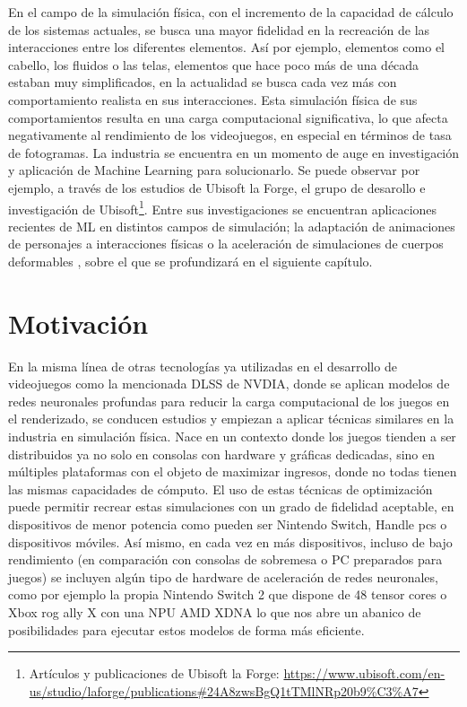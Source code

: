 En el campo de la simulación física, con el incremento de la capacidad de cálculo de los sistemas actuales, se busca una mayor fidelidad en la recreación de las interacciones entre los diferentes elementos. Así por ejemplo, elementos como el cabello, los fluidos o las telas, elementos que hace poco más de una década estaban muy simplificados, en la actualidad se busca cada vez más con comportamiento realista en sus interacciones. Esta simulación física de sus comportamientos resulta en una carga computacional significativa, lo que afecta negativamente al rendimiento de los videojuegos, en especial en términos de tasa de fotogramas. La industria se encuentra en un momento de auge en investigación y aplicación de Machine Learning para solucionarlo. Se puede observar por ejemplo, a través de los estudios de Ubisoft la Forge, el grupo de desarollo e investigación de Ubisoft\footnote{Artículos y publicaciones de Ubisoft la Forge: \url{https://www.ubisoft.com/en-us/studio/laforge/publications\#24A8zwsBgQ1tTMlNRp20b9\%C3\%A7}}. Entre sus investigaciones se encuentran aplicaciones recientes de ML en distintos campos de simulación; la adaptación de animaciones de personajes a interacciones físicas \cite{drecon2019} o la aceleración de simulaciones de cuerpos deformables \cite{holden_subspace_2019}, sobre el que se profundizará en el siguiente capítulo. \newline



\section{Motivación}
En la misma línea de otras tecnologías ya utilizadas en el desarrollo de videojuegos como la mencionada DLSS de NVDIA, donde se aplican modelos de redes neuronales profundas para reducir la carga computacional de los juegos en el renderizado, se conducen estudios y empiezan a aplicar técnicas similares en la industria en simulación física. Nace en un contexto donde los juegos tienden a ser distribuidos ya no solo en consolas con hardware y gráficas dedicadas, sino en múltiples plataformas con el objeto de maximizar ingresos, donde no todas tienen las mismas capacidades de cómputo.  El uso de estas técnicas de optimización puede permitir recrear estas simulaciones con un grado de fidelidad aceptable, en dispositivos de menor potencia como pueden ser Nintendo Switch, Handle pcs o dispositivos móviles. Así mismo, en cada vez en más dispositivos, incluso de bajo rendimiento (en comparación con consolas de sobremesa o PC preparados para juegos) se incluyen algún tipo de hardware de aceleración de redes neuronales, como por ejemplo la propia Nintendo Switch 2 que dispone de 48 tensor cores o Xbox rog ally X con una NPU AMD XDNA lo que nos abre un abanico de posibilidades para ejecutar estos modelos de forma más eficiente.\newline

